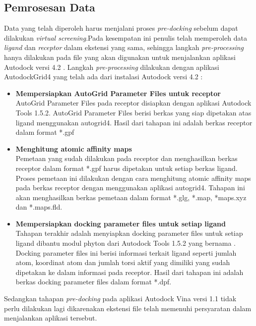 \subsection{Pemrosesan Data}
\hspace{0.5cm}Data yang telah diperoleh harus menjalani proses \textit{pre-docking} sebelum dapat dilakukan \textit{virtual screening}.Pada kesempatan ini penulis telah memperoleh data \textit{ligand} dan \textit{receptor} dalam ekstensi yang sama, sehingga langkah \textit{pre-processing} hanya dilakukan pada file yang akan digunakan untuk menjalankan aplikasi Autodock versi 4.2 \cite{tutorial autodock}. Langkah \textit{pre-processing} dilakukan dengan aplikasi AutodockGrid4 yang telah ada dari instalasi Autodock versi 4.2 :
\begin{itemize}
	\item \textbf{Mempersiapkan AutoGrid Parameter Files untuk receptor} \\
	AutoGrid Parameter Files pada receptor disiapkan dengan aplikasi
	Autodock Tools 1.5.2. AutoGrid Parameter Files berisi berkas yang siap
	dipetakan atas ligand menggunakan autogrid4. Hasil dari tahapan ini adalah
	berkas receptor dalam format *.gpf
	\item \textbf{Menghitung atomic affinity maps} \\
	Pemetaan yang sudah dilakukan pada receptor dan menghasilkan
	berkas receptor dalam format *.gpf harus dipetakan untuk setiap berkas
	ligand. Proses pemetaan ini dilakukan dengan cara menghitung atomic
	affinity maps pada berkas receptor dengan menggunakan aplikasi autogrid4.
	Tahapan ini akan menghasilkan berkas pemetaan dalam format *.glg,
	*.map, *maps.xyz dan *.maps.fld.
	\item \textbf{Mempersiapkan docking parameter files untuk setiap ligand}  \\
	Tahapan terakhir adalah menyiapkan docking parameter files untuk
	setiap ligand dibantu modul phyton dari Autodock Tools 1.5.2 yang
	bernama . Docking parameter files ini berisi informasi
	terkait ligand seperti jumlah atom, koordinat atom dan jumlah torsi aktif
	yang dimiliki yang sudah dipetakan ke dalam informasi pada receptor. Hasil
	dari tahapan ini adalah berkas docking parameter files dalam format *.dpf.
\end{itemize}

Sedangkan tahapan \textit{pre-docking} pada aplikasi Autodock Vina versi 1.1 tidak perlu dilakukan lagi dikarenakan ekstensi file telah memenuhi persyaratan dalam menjalankan aplikasi tersebut. 

